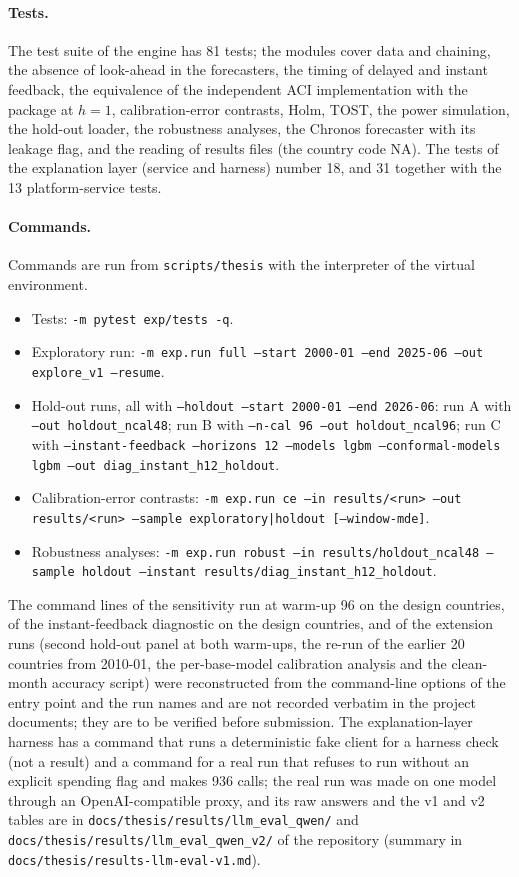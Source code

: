\paragraph{Tests.} The test suite of the engine has 81 tests; the modules cover data and chaining, the absence of look-ahead in the forecasters, the timing of delayed and instant feedback, the equivalence of the independent ACI implementation with the package at $h=1$, calibration-error contrasts, Holm, TOST, the power simulation, the hold-out loader, the robustness analyses, the Chronos forecaster with its leakage flag, and the reading of results files (the country code NA). The tests of the explanation layer (service and harness) number 18, and 31 together with the 13 platform-service tests.

\paragraph{Commands.} Commands are run from \texttt{scripts/thesis} with the interpreter of the virtual environment.
\begin{itemize}
\item Tests: \texttt{-m pytest exp/tests -q}.
\item Exploratory run: \texttt{-m exp.run full --start 2000-01 --end 2025-06 --out explore\_v1 --resume}.
\item Hold-out runs, all with \texttt{--holdout --start 2000-01 --end 2026-06}: run A with \texttt{--out holdout\_ncal48}; run B with \texttt{--n-cal 96 --out holdout\_ncal96}; run C with \texttt{--instant-feedback --horizons 12 --models lgbm --conformal-models lgbm --out diag\_instant\_h12\_holdout}.
\item Calibration-error contrasts: \texttt{-m exp.run ce --in results/<run> --out results/<run> --sample exploratory|holdout [--window-mde]}.
\item Robustness analyses: \texttt{-m exp.run robust --in results/holdout\_ncal48 --sample holdout --instant results/diag\_instant\_h12\_holdout}.
\end{itemize}
The command lines of the sensitivity run at warm-up 96 on the design countries, of the instant-feedback diagnostic on the design countries, and of the extension runs (second hold-out panel at both warm-ups, the re-run of the earlier 20 countries from 2010-01, the per-base-model calibration analysis and the clean-month accuracy script) were reconstructed from the command-line options of the entry point and the run names and are not recorded verbatim in the project documents; they are to be verified before submission. The explanation-layer harness has a command that runs a deterministic fake client for a harness check (not a result) and a command for a real run that refuses to run without an explicit spending flag and makes 936 calls; the real run was made on one model through an OpenAI-compatible proxy, and its raw answers and the v1 and v2 tables are in \texttt{docs/thesis/results/llm\_eval\_qwen/} and \texttt{docs/thesis/results/llm\_eval\_qwen\_v2/} of the repository (summary in \texttt{docs/thesis/results-llm-eval-v1.md}).

